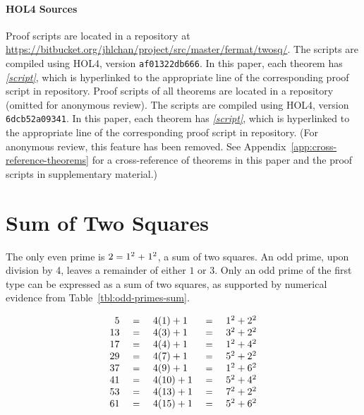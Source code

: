 \documentclass[sigplan,screen]{acmart}
\newcommand\urlpre{https://bitbucket.org/jhlchan/project/src/aed43871448e/fermat/twosq/}
\newcommand{\script}[3][script]{\href{\urlpre#2Script.sml\#lines-#3}{[#1]}} %
\newcommand{\script}[3][script]{\textit{[script]}} %
\newcommand{\ee}{\ \HOLConst{=}\ } %
\renewcommand{\HOLinline}[1]{\ensuremath{#1}} %
\renewcommand{\HOLConst}[1]{{\fontsize{9pt}{1em}\selectfont\textsf{\upshape #1}}}
\renewcommand{\HOLNumLit}[1]{{\selectfont\textrm{\upshape #1}}} %
\renewcommand{\HOLSymConst}[1]{{\fontsize{9pt}{1em}\selectfont\textsf{\upshape #1}}}
\begin{document}
\paragraph*{HOL4 Sources}
\ifdefined\READY
Proof scripts are located in a repository at {\small\url{https://bitbucket.org/jhlchan/project/src/master/fermat/twosq/}}.
The scripts are compiled using HOL4, version \texttt{af01322db666}.
In this paper, each theorem has \emph{\script{windmill}{197}}, %
which is hyperlinked to the appropriate line of the corresponding proof script in repository.
\else
Proof scripts of all theorems are located in a repository (omitted for anonymous review).
The scripts are compiled using HOL4, version \texttt{6dcb52a09341}.
In this paper, each theorem has \emph{\script{windmill}{197}}, %
which is hyperlinked to the appropriate line of the corresponding proof script in repository.
(For anonymous review, this feature has been removed. See Appendix~\ref{app:cross-reference-theorems} for a cross-reference of theorems in this paper and the proof scripts in supplementary material.)
\fi


\section{Sum of Two Squares}
\label{sec:sum-of-two-squares}
The only even prime is \HOLinline{\HOLNumLit{2}\;\HOLSymConst{=}\;\HOLNumLit{1}\ensuremath{{\sp{\HOLNumLit{2}}}}\;\HOLSymConst{\ensuremath{+}}\;\HOLNumLit{1}\ensuremath{{\sp{\HOLNumLit{2}}}}}, a sum of two squares.
An odd prime, upon division by 4, leaves a remainder of either $1$ or $3$.
Only an odd prime of the first type can be expressed as a sum of two squares,
as supported by numerical evidence from Table~\ref{tbl:odd-primes-sum}.

\begin{table}[h] %
\caption{Examples of odd primes that can be expressed as a sum of two squares.}
\label{tbl:odd-primes-sum}  %
\[
\begin{array}{r@{\quad\ee\quad}l@{\quad\ee\quad}l}
     5 & 4(1) + 1  & 1^{2} + 2^{2}\\
    13 & 4(3) + 1  & 3^{2} + 2^{2}\\
    17 & 4(4) + 1  & 1^{2} + 4^{2}\\
    29 & 4(7) + 1  & 5^{2} + 2^{2}\\
    37 & 4(9) + 1  & 1^{2} + 6^{2}\\
    41 & 4(10) + 1  & 5^{2} + 4^{2}\\
    53 & 4(13) + 1  & 7^{2} + 2^{2}\\
    61 & 4(15) + 1  & 5^{2} + 6^{2}\\
\end{array}
\]
\end{table}
\end{document}

